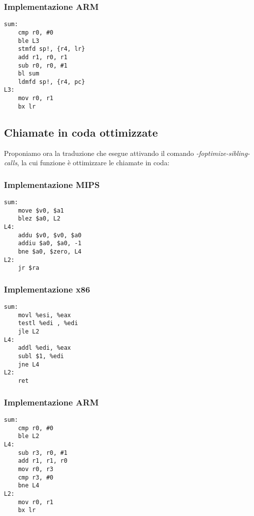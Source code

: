\documentclass[class=book, crop=false, oneside]{standalone}
\begin{document}
\subsubsection{Implementazione ARM}

\begin{verbatim}
sum:
	cmp r0, #0
	ble L3
	stmfd sp!, {r4, lr}
	add r1, r0, r1
	sub r0, r0, #1
	bl sum
	ldmfd sp!, {r4, pc}
L3:
	mov r0, r1
	bx lr
\end{verbatim}

\subsection*{Chiamate in coda ottimizzate}
Proponiamo ora la traduzione che  esegue attivando il comando \emph{-foptimize-sibling-calls}, la cui funzione è ottimizzare le chiamate in coda:
\subsubsection{Implementazione MIPS}

\begin{verbatim}
sum:
	move $v0, $a1
	blez $a0, L2
L4:
	addu $v0, $v0, $a0
	addiu $a0, $a0, -1
	bne $a0, $zero, L4
L2:
	jr $ra
\end{verbatim}

\subsubsection{Implementazione x86}

\begin{verbatim}
sum:
	movl %esi, %eax
	testl %edi , %edi
	jle L2
L4:
	addl %edi, %eax
	subl $1, %edi
	jne L4
L2:
	ret
\end{verbatim}

\subsubsection{Implementazione ARM}

\begin{verbatim}
sum:
	cmp r0, #0
	ble L2
L4:
	sub r3, r0, #1
	add r1, r1, r0
	mov r0, r3
	cmp r3, #0
	bne L4
L2:
	mov r0, r1
	bx lr
\end{verbatim}
\end{document}

